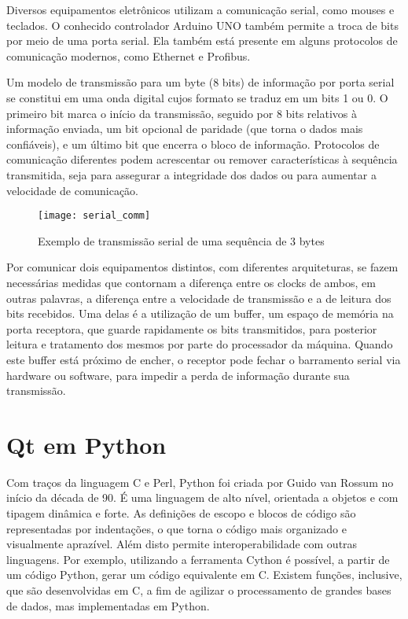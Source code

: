 Diversos equipamentos eletrônicos utilizam a comunicação serial, como mouses e teclados. O conhecido controlador Arduino UNO também permite a troca de bits por meio de uma porta serial. Ela também está presente em alguns protocolos de comunicação modernos, como Ethernet e Profibus.

Um modelo de transmissão para um byte (8 bits) de informação por porta serial se constitui em uma onda digital cujos formato se traduz em um bits 1 ou 0. O primeiro bit marca o início da transmissão, seguido por 8 bits relativos à informação enviada, um bit opcional de paridade (que torna o dados mais confiáveis), e um último bit que encerra o bloco de informação. Protocolos de comunicação diferentes podem acrescentar ou remover características à sequência transmitida, seja para assegurar a integridade dos dados ou para aumentar a velocidade de comunicação.

\begin{figure}
	\centering
	\texttt{[image: serial\_comm]}
	\caption{Exemplo de transmissão serial de uma sequência de 3 bytes}
	\label{img_serial_comm}
\end{figure}

Por comunicar dois equipamentos distintos, com diferentes arquiteturas, se fazem necessárias medidas que contornam a diferença entre os clocks de ambos, em outras palavras, a diferença entre a velocidade de transmissão e a de leitura dos bits recebidos. Uma delas é a utilização de um buffer, um espaço de memória na porta receptora, que guarde rapidamente os bits transmitidos, para posterior leitura e tratamento dos mesmos por parte do processador da máquina. Quando este buffer está próximo de encher, o receptor pode fechar o barramento serial via hardware ou software, para impedir a perda de informação durante sua transmissão.

\section{Qt em Python}

Com traços da linguagem C e Perl, Python foi criada por Guido van Rossum no início da década de 90. É uma linguagem de alto nível, orientada a objetos e com tipagem dinâmica e forte. As definições de escopo e blocos de código são representadas por indentações, o que torna o código mais organizado e visualmente aprazível. Além disto permite interoperabilidade com outras linguagens. Por exemplo, utilizando a ferramenta Cython é possível, a partir de um código Python, gerar um código equivalente em C. Existem funções, inclusive, que são desenvolvidas em C, a fim de agilizar o processamento de grandes bases de dados, mas implementadas em Python.

